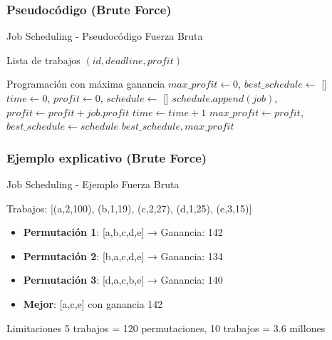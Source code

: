 \documentclass[aspectratio=169]{beamer}
\renewcommand{\algorithmicrequire}{\textbf{Entrada:}}
\renewcommand{\algorithmicensure}{\textbf{Salida:}}
\newcommand{\REQUIRE}{\item[\algorithmicrequire]}
\newcommand{\ENSURE}{\item[\algorithmicensure]}
\begin{document}
\subsubsection{Pseudocódigo (Brute Force)}
\begin{frame}[fragile]{Job Scheduling - Pseudocódigo Fuerza Bruta}
\begin{algorithmic}[1]
\REQUIRE Lista de trabajos $(id, deadline, profit)$
\ENSURE Programación con máxima ganancia
\State $max\_profit \leftarrow 0$, $best\_schedule \leftarrow$ []
    \State $time \leftarrow 0$, $profit \leftarrow 0$, $schedule \leftarrow$ []
            \State $schedule.append(job)$, $profit \leftarrow profit + job.profit$
            \State $time \leftarrow time + 1$
        \EndIf
    \EndFor
        \State $max\_profit \leftarrow profit$, $best\_schedule \leftarrow schedule$
    \EndIf
\EndFor
\Return $best\_schedule, max\_profit$
\end{algorithmic}
\end{frame}

\subsubsection{Ejemplo explicativo (Brute Force)}
\begin{frame}{Job Scheduling - Ejemplo Fuerza Bruta}
\begin{exampleblock}{Trabajos: [(a,2,100), (b,1,19), (c,2,27), (d,1,25), (e,3,15)]}
\begin{itemize}
\item \textbf{Permutación 1}: [a,b,c,d,e] → Ganancia: 142
\item \textbf{Permutación 2}: [b,a,c,d,e] → Ganancia: 134
\item \textbf{Permutación 3}: [d,a,c,b,e] → Ganancia: 140
\item \textbf{Mejor}: [a,c,e] con ganancia 142
\end{itemize}
\end{exampleblock}

\begin{alertblock}{Limitaciones}
5 trabajos = 120 permutaciones, 10 trabajos = 3.6 millones
\end{alertblock}
\end{frame}
\end{document}
